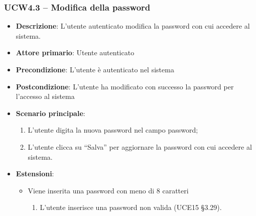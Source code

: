 \subsubsection{UCW4.3 – Modifica della password}
\begin{itemize}
\item \textbf{Descrizione}: L'utente autenticato modifica la password con cui accedere al sistema.
\item \textbf{Attore primario}: Utente autenticato
\item \textbf{Precondizione}: L’utente è autenticato nel sistema
\item \textbf{Postcondizione}: L’utente ha modificato con successo la password per l’accesso al sistema

\item \textbf{Scenario principale}:
\begin{enumerate}
\item L’utente digita la nuova password nel campo password;
\item L’utente clicca su “Salva” per aggiornare la password con cui accedere al sistema.
\end{enumerate}

\item \textbf{Estensioni}:
\begin{itemize}
\item Viene inserita una password con meno di 8 caratteri
\begin{enumerate}
	\item L'utente inserisce una password non valida (UCE15 §3.29).
\end{enumerate}
\end{itemize}
\end{itemize}

\pagebreak